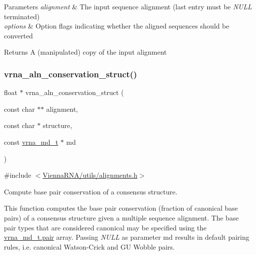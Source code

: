 \begin{DoxyParams}{Parameters}
{\em alignment} & The input sequence alignment (last entry must be {\itshape N\+U\+LL} terminated) \\
\hline
{\em options} & Option flags indicating whether the aligned sequences should be converted \\
\hline
\end{DoxyParams}
\begin{DoxyReturn}{Returns}
A (manipulated) copy of the input alignment 
\end{DoxyReturn}
\mbox{\label{group__aln__utils_gab6f16a2ea93f3bfd4d089cc8d448bb16}} 
\subsubsection{\texorpdfstring{vrna\+\_\+aln\+\_\+conservation\+\_\+struct()}{vrna\_aln\_conservation\_struct()}}
{\footnotesize\ttfamily float $\ast$ vrna\+\_\+aln\+\_\+conservation\+\_\+struct (\begin{DoxyParamCaption}\item[{const char $\ast$$\ast$}]{alignment,  }\item[{const char $\ast$}]{structure,  }\item[{const \hyperlink{group__model__details_ga1f8a10e12a0a1915f2a4eff0b28ea17c}{vrna\+\_\+md\+\_\+t} $\ast$}]{md }\end{DoxyParamCaption})}



{\ttfamily \#include $<$\hyperlink{utils_2alignments_8h}{Vienna\+R\+N\+A/utils/alignments.\+h}$>$}



Compute base pair conservation of a consensus structure. 

This function computes the base pair conservation (fraction of canonical base pairs) of a consensus structure given a multiple sequence alignment. The base pair types that are considered canonical may be specified using the \hyperlink{group__model__details_ab4da594c638707e212f64aadb54a7454}{vrna\+\_\+md\+\_\+t.\+pair} array. Passing {\itshape N\+U\+LL} as parameter {\ttfamily md} results in default pairing rules, i.\+e. canonical Watson-\/\+Crick and GU Wobble pairs.


